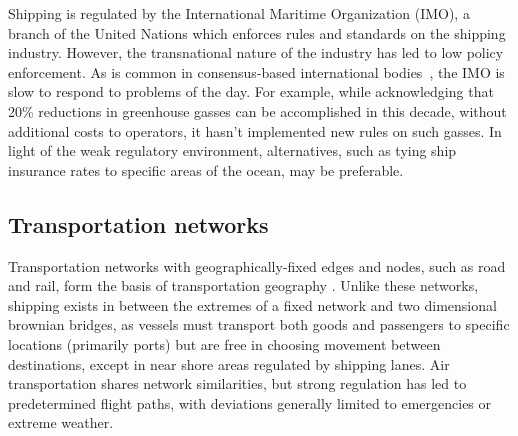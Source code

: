   Shipping is regulated by the International Maritime Organization (IMO), a branch of the United Nations which enforces rules and standards on the shipping industry. However, the transnational nature of the industry has led to low policy enforcement. As is common in consensus-based international bodies~\citep{cogan2009representation}, the IMO is slow to respond to problems of the day. 
  For example, while acknowledging that 20\% reductions in greenhouse gasses can be accomplished in this decade, without additional costs to operators\citep{imo2009}, it hasn't implemented new rules on such gasses.  In light of the weak regulatory environment, alternatives, such as tying ship insurance rates to specific areas of the ocean, may be preferable.



\subsection{Transportation networks}

Transportation networks with geographically-fixed edges and nodes, such as road and rail, form the basis of transportation geography \citep{Rodrigue2009}. Unlike these networks, shipping exists in between the extremes of a fixed network %
 and two dimensional brownian bridges, %
  as vessels must transport both goods and passengers to specific locations (primarily ports) but are free in choosing movement between destinations, except in near shore areas regulated by shipping lanes. Air transportation shares network similarities, but strong regulation has led to predetermined flight paths, with deviations generally limited to emergencies or extreme weather. %


